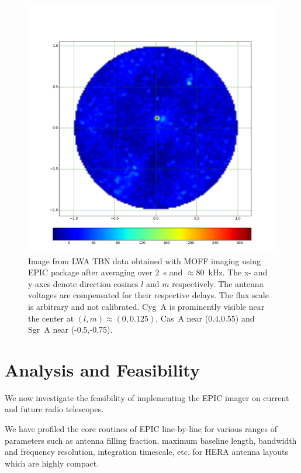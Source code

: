 \documentclass[a4paper,fleqn,usenatbib]{../mnras}
\begin{document}
\begin{figure}
  \includegraphics[width=\columnwidth]{LWA_sample_image_391_iterations.png}
  \caption{Image from LWA TBN data obtained with MOFF imaging using EPIC 
    package after averaging over 2~s and $\approx 80$~kHz. The x- and y-axes
    denote direction cosines $l$ and $m$ respectively. The antenna voltages
    are compensated for their respective delays. The flux scale is arbitrary
    and not calibrated. Cyg~A is prominently visible near the center at
    $(l,m)\approx (0, 0.125)$, Cas~A near (0.4,0.55) and Sgr~A near 
    (-0.5,-0.75).}
  \label{fig:LWA-image}
\end{figure}

\section{Analysis and Feasibility}\label{sec:analysis}

We now investigate the feasibility of implementing the EPIC imager on current
and future radio telescopes. 

We have profiled the core routines of EPIC line-by-line for various ranges of
parameters such as antenna filling fraction, maximum baseline 
length, bandwidth and frequency resolution, integration timescale, etc. for 
HERA antenna layouts which are highly compact. 
\end{document}
